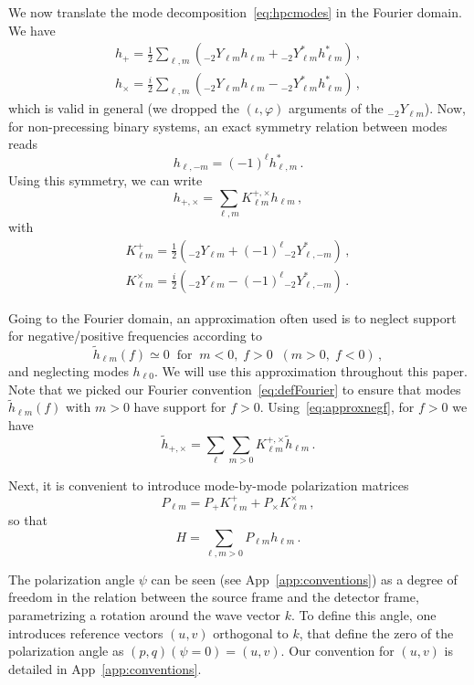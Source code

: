 \documentclass[aps,showpacs,twocolumn,prd,superscriptaddress,nofootinbib]{revtex4-1}
\newcommand{\be}{\begin{equation}}
\newcommand{\ee}{\end{equation}}
\newcommand{\bsub}{\begin{subequations}}
\newcommand{\esub}{\end{subequations}}
\newcommand{\sYlm}{{}_{-2}Y_{\ell m}}
\newcommand{\sYlmstar}{{}_{-2}Y_{\ell m}^{*}}
\newcommand{\sYlminusmstar}{{}_{-2}Y_{\ell, -m}^{*}}
\begin{document}
We now translate the mode decomposition~\eqref{eq:hpcmodes} in the Fourier domain. We have
\bsub
\begin{align}
	h_{+} = \frac{1}{2} \sum_{\ell, m} \left( \sYlm h_{\ell m} + \sYlmstar h_{\ell m}^{*} \right) \,,\\
	h_{\times} = \frac{i}{2} \sum_{\ell, m} \left( \sYlm h_{\ell m} - \sYlmstar h_{\ell m}^{*} \right) \,,
\end{align}
\esub
which is valid in general (we dropped the $(\iota, \varphi)$ arguments of the $\sYlm$). Now, for non-precessing binary systems, an exact symmetry relation between modes reads
\be\label{eq:nonprecsymmetry}
	h_{\ell, -m} = (-1)^{\ell} h_{\ell, m}^{*} \,.
\ee
Using this symmetry, we can write
\be
	h_{+,\times} = \sum_{\ell, m} K_{\ell m}^{+, \times} h_{\ell m} \,,
\ee
with
\bsub
\begin{align}
	K_{\ell m}^{+} =\frac{1}{2} \left( \sYlm + (-1)^{\ell} \sYlminusmstar \right) \,,\\
	K_{\ell m}^{\times} = \frac{i}{2} \left( \sYlm - (-1)^{\ell} \sYlminusmstar \right) \,.
\end{align}
\esub

Going to the Fourier domain, an approximation often used is to neglect support for negative/positive frequencies according to
\be\label{eq:approxnegf}
	\tilde{h}_{\ell m} (f) \simeq 0 \;\; \text{for} \;\; m<0, \; f>0 \;\; ( m>0, \; f<0 )\,,
\ee
and neglecting modes $h_{\ell 0}$. We will use this approximation throughout this paper. Note that we picked our Fourier convention~\eqref{eq:defFourier} to ensure that modes $\tilde{h}_{\ell m} (f)$ with $m>0$ have support for $f>0$. Using~\eqref{eq:approxnegf}, for $f>0$ we have
\be
	\tilde{h}_{+,\times} = \sum_{\ell} \sum_{m>0} K_{\ell m}^{+, \times} \tilde{h}_{\ell m} \,.
\ee

Next, it is convenient to introduce mode-by-mode polarization matrices
\be
	P_{\ell m} = P_{+} K_{\ell m}^{+} + P_{\times} K_{\ell m}^{\times} \,,
\ee
so that
\be\label{eq:Hsummodes}
	H = \sum_{\ell, m > 0} P_{\ell m} h_{\ell m} \,.
\ee

The polarization angle $\psi$ can be seen (see App~\ref{app:conventions}) as a degree of freedom in the relation between the source frame and the detector frame, parametrizing a rotation around the wave vector $k$. To define this angle, one introduces reference vectors $(u,v)$ orthogonal to $k$, that define the zero of the polarization angle as $(p,q)(\psi=0) = (u,v)$. Our convention for $(u,v)$ is detailed in App~\ref{app:conventions}.
\end{document}
